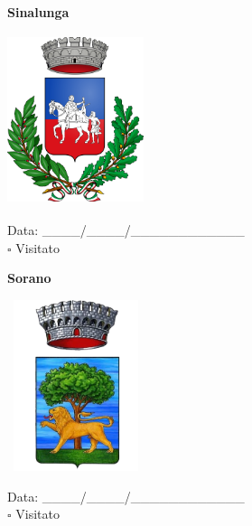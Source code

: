 \documentclass[a5paper,12pt]{article}
\begin{document}
\newpage

\noindent
\begin{minipage}[t]{0.45\textwidth}
    \begin{center}
        \textbf{Sinalunga}
    \end{center}
    \vspace{-0.5cm} %
    \begin{center}
        \includegraphics[height= 5cm, width=4cm]{Toscana/Stemma Sinalunga.png}
    \end{center}
    \vspace{-0.4cm} %
    \begin{flushleft}
        Data: \_\_\_\_/\_\_\_\_/\_\_\_\_\_\_\_\_\_\_\_\_ \\
        $\square$ Visitato
    \end{flushleft}
\end{minipage}
\hfill
\noindent
\begin{minipage}[t]{0.45\textwidth}
    \begin{center}
        \textbf{Sorano}
    \end{center}
    \vspace{-0.5cm} %
    \begin{center}
        \includegraphics[height= 5cm, width=4cm]{Toscana/Stemma Suvereto.png}
    \end{center}
    \vspace{-0.4cm} %
    \begin{flushleft}
        Data: \_\_\_\_/\_\_\_\_/\_\_\_\_\_\_\_\_\_\_\_\_ \\
        $\square$ Visitato
    \end{flushleft}
\end{minipage}
\end{document}
